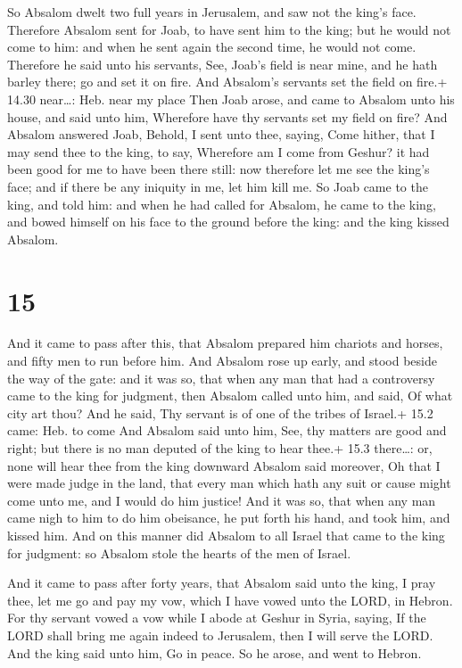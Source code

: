  So Absalom dwelt two full years in Jerusalem, and saw
not the king's face.  Therefore Absalom sent for Joab, to
have sent him to the king; but he would not come to him: and when he
sent again the second time, he would not come.  Therefore
he said unto his servants, See, Joab's field is near mine, and he hath
barley there; go and set it on fire. And Absalom's servants set the
field on fire.+ 14.30 near\ldots: Heb. near my place  Then
Joab arose, and came to Absalom unto his house, and said unto him,
Wherefore have thy servants set my field on fire?  And
Absalom answered Joab, Behold, I sent unto thee, saying, Come hither,
that I may send thee to the king, to say, Wherefore am I come from
Geshur? it had been good for me to have been there still: now therefore
let me see the king's face; and if there be any iniquity in me, let him
kill me.  So Joab came to the king, and told him: and when
he had called for Absalom, he came to the king, and bowed himself on his
face to the ground before the king: and the king kissed Absalom.

\hypertarget{section-14}{%
\section{15}\label{section-14}}

 And it came to pass after this, that Absalom prepared him
chariots and horses, and fifty men to run before him.  And
Absalom rose up early, and stood beside the way of the gate: and it was
so, that when any man that had a controversy came to the king for
judgment, then Absalom called unto him, and said, Of what city art thou?
And he said, Thy servant is of one of the tribes of Israel.+ 15.2 came:
Heb. to come  And Absalom said unto him, See, thy matters
are good and right; but there is no man deputed of the king to hear
thee.+ 15.3 there\ldots: or, none will hear thee from the king downward
 Absalom said moreover, Oh that I were made judge in the
land, that every man which hath any suit or cause might come unto me,
and I would do him justice!  And it was so, that when any
man came nigh to him to do him obeisance, he put forth his hand, and
took him, and kissed him.  And on this manner did Absalom to
all Israel that came to the king for judgment: so Absalom stole the
hearts of the men of Israel.

 And it came to pass after forty years, that Absalom said
unto the king, I pray thee, let me go and pay my vow, which I have vowed
unto the LORD, in Hebron.  For thy servant vowed a vow while
I abode at Geshur in Syria, saying, If the LORD shall bring me again
indeed to Jerusalem, then I will serve the LORD.  And the
king said unto him, Go in peace. So he arose, and went to Hebron.


